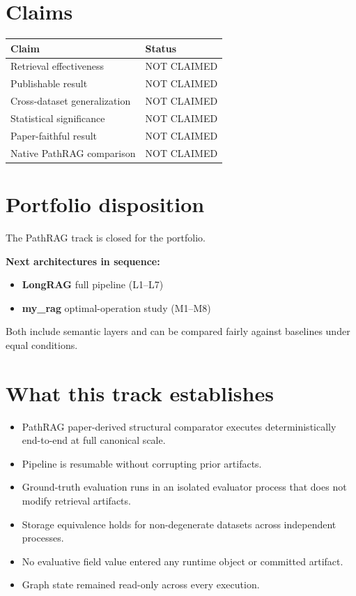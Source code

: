 \documentclass[11pt,a4paper]{article}
\begin{document}
\section{Claims}

\begin{tabular}{ll}
\toprule
Claim & Status \\ \midrule
Retrieval effectiveness & NOT CLAIMED \\
Publishable result & NOT CLAIMED \\
Cross-dataset generalization & NOT CLAIMED \\
Statistical significance & NOT CLAIMED \\
Paper-faithful result & NOT CLAIMED \\
Native PathRAG comparison & NOT CLAIMED \\
\bottomrule
\end{tabular}

\section{Portfolio disposition}

The PathRAG track is closed for the portfolio.

\textbf{Next architectures in sequence:}
\begin{itemize}[leftmargin=*]
    \item \textbf{LongRAG} full pipeline (L1--L7)
    \item \textbf{my\_rag} optimal-operation study (M1--M8)
\end{itemize}

Both include semantic layers and can be compared fairly
against baselines under equal conditions.

\section{What this track establishes}

\begin{itemize}[leftmargin=*]
    \item PathRAG paper-derived structural comparator executes deterministically end-to-end at full canonical scale.
    \item Pipeline is resumable without corrupting prior artifacts.
    \item Ground-truth evaluation runs in an isolated evaluator process that does not modify retrieval artifacts.
    \item Storage equivalence holds for non-degenerate datasets across independent processes.
    \item No evaluative field value entered any runtime object or committed artifact.
    \item Graph state remained read-only across every execution.
\end{itemize}
\end{document}
